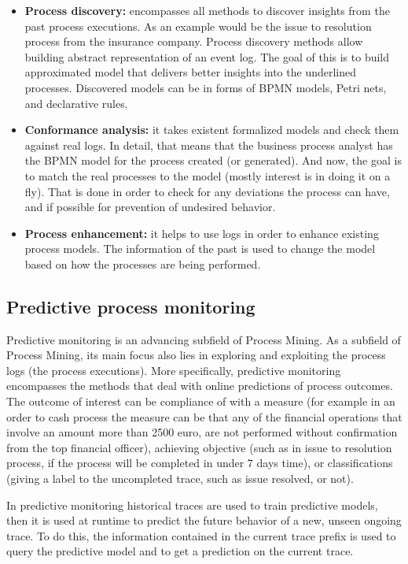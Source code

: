 \begin{itemize}
	\item \textbf{Process discovery:} encompasses all methods to discover insights from the past process executions. As an example would be the issue to resolution process from the insurance company. Process discovery methods allow building abstract representation of an event log. The goal of this is to build approximated model that delivers better insights into the underlined processes. Discovered models can be in forms of BPMN models, Petri nets, and declarative rules. 
	\item \textbf{Conformance analysis:} it takes existent formalized models and check them against real logs. In detail, that means that the business process analyst has the BPMN model for the process created (or generated). And now, the goal is to match the real processes to the model (mostly interest is in doing it on a fly). That is done in order to check for any deviations the process can have, and if possible for prevention of undesired behavior.
	\item \textbf{Process enhancement:} it helps to use logs in order to enhance existing process models. The information of the past is used to change the model based on how the processes are being performed.
\end{itemize}
 


\subsection{Predictive process monitoring}

Predictive monitoring is an advancing subfield of Process Mining. As a subfield of Process Mining, its main focus also lies in exploring and exploiting the process logs (the process executions). More specifically, predictive monitoring encompasses the methods that deal with online predictions of process outcomes. The outcome of interest can be compliance of with a measure (for example in an order to cash process the measure can be that any of the financial operations that involve an amount more than 2500 euro, are not performed without confirmation from the top financial officer), achieving objective (such as in issue to resolution process, if the process will be completed in under 7 days time), or classifications (giving a label to the uncompleted trace, such as issue resolved, or not).  
\par
In predictive monitoring historical traces are used to train predictive models, then it is used at runtime to predict the future behavior of a new, unseen ongoing trace. To do this, the information contained in the current trace prefix is used to query the predictive model and to get a prediction on the current trace.

